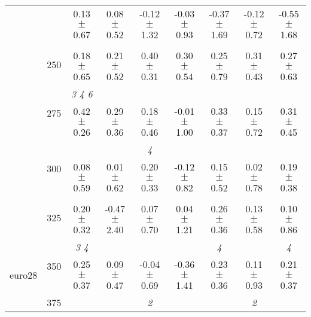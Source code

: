 \begin{table}[h]
{\begin{tabular}{
        ccccccccc}
 & & \cellcolor[HTML]{EFEFEF} 0.13 $\pm$ 0.67& \cellcolor[HTML]{EFEFEF} 0.08 $\pm$ 0.52& \cellcolor[HTML]{EFEFEF} -0.12 $\pm$ 1.32& \cellcolor[HTML]{EFEFEF} -0.03 $\pm$ 0.93& \cellcolor[HTML]{EFEFEF} -0.37 $\pm$ 1.69& \cellcolor[HTML]{EFEFEF} -0.12 $\pm$ 0.72& \cellcolor[HTML]{EFEFEF} -0.55 $\pm$ 1.68 \\ 
 & \multirow{2}{*}{250}& & & & & & &  \\ 
 & & 0.18 $\pm$ 0.65& 0.21 $\pm$ 0.52& 0.40 $\pm$ 0.31& 0.30 $\pm$ 0.54& 0.25 $\pm$ 0.79& 0.31 $\pm$ 0.43& 0.27 $\pm$ 0.63 \\ 
 & \multirow{2}{*}{275}& \cellcolor[HTML]{EFEFEF} \textit{ 3 4 6 }& \cellcolor[HTML]{EFEFEF} & \cellcolor[HTML]{EFEFEF} & \cellcolor[HTML]{EFEFEF} & \cellcolor[HTML]{EFEFEF} & \cellcolor[HTML]{EFEFEF} & \cellcolor[HTML]{EFEFEF}  \\ 
 & & \cellcolor[HTML]{EFEFEF} 0.42 $\pm$ 0.26& \cellcolor[HTML]{EFEFEF} 0.29 $\pm$ 0.36& \cellcolor[HTML]{EFEFEF} 0.18 $\pm$ 0.46& \cellcolor[HTML]{EFEFEF} -0.01 $\pm$ 1.00& \cellcolor[HTML]{EFEFEF} 0.33 $\pm$ 0.37& \cellcolor[HTML]{EFEFEF} 0.15 $\pm$ 0.72& \cellcolor[HTML]{EFEFEF} 0.31 $\pm$ 0.45 \\ 
 & \multirow{2}{*}{300}& & & \textit{ 4 }& & & &  \\ 
 & & 0.08 $\pm$ 0.59& 0.01 $\pm$ 0.62& 0.20 $\pm$ 0.33& -0.12 $\pm$ 0.82& 0.15 $\pm$ 0.52& 0.02 $\pm$ 0.78& 0.19 $\pm$ 0.38 \\ 
 & \multirow{2}{*}{325}& \cellcolor[HTML]{EFEFEF} & \cellcolor[HTML]{EFEFEF} & \cellcolor[HTML]{EFEFEF} & \cellcolor[HTML]{EFEFEF} & \cellcolor[HTML]{EFEFEF} & \cellcolor[HTML]{EFEFEF} & \cellcolor[HTML]{EFEFEF}  \\ 
 & & \cellcolor[HTML]{EFEFEF} 0.20 $\pm$ 0.32& \cellcolor[HTML]{EFEFEF} -0.47 $\pm$ 2.40& \cellcolor[HTML]{EFEFEF} 0.07 $\pm$ 0.70& \cellcolor[HTML]{EFEFEF} 0.04 $\pm$ 1.21& \cellcolor[HTML]{EFEFEF} 0.26 $\pm$ 0.36& \cellcolor[HTML]{EFEFEF} 0.13 $\pm$ 0.58& \cellcolor[HTML]{EFEFEF} 0.10 $\pm$ 0.86 \\ 
 \multirow{4}{*}{euro28} & \multirow{2}{*}{350}& \textit{ 3 4 }& & & & \textit{ 4 }& & \textit{ 4 } \\ 
 & & 0.25 $\pm$ 0.37& 0.09 $\pm$ 0.47& -0.04 $\pm$ 0.69& -0.36 $\pm$ 1.41& 0.23 $\pm$ 0.36& 0.11 $\pm$ 0.93& 0.21 $\pm$ 0.37 \\ 
 & \multirow{2}{*}{375}& \cellcolor[HTML]{EFEFEF} & \cellcolor[HTML]{EFEFEF} & \cellcolor[HTML]{EFEFEF} \textit{ 2 }& \cellcolor[HTML]{EFEFEF} & \cellcolor[HTML]{EFEFEF} & \cellcolor[HTML]{EFEFEF} \textit{ 2 }& \cellcolor[HTML]{EFEFEF}  \\ 

\end{tabular}}
\end{table}
